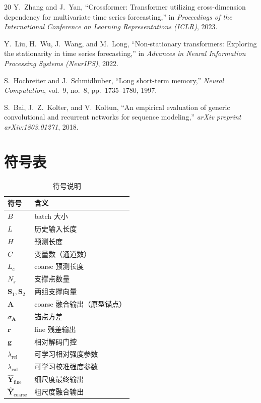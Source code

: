 \documentclass[journal]{IEEEtran}
\begin{document}
\begin{thebibliography}{20}
Y.~Zhang and J.~Yan, ``Crossformer: Transformer utilizing cross-dimension dependency for multivariate time series forecasting,'' in \emph{Proceedings of the International Conference on Learning Representations (ICLR)}, 2023.

Y.~Liu, H.~Wu, J.~Wang, and M.~Long, ``Non-stationary transformers: Exploring the stationarity in time series forecasting,'' in \emph{Advances in Neural Information Processing Systems (NeurIPS)}, 2022.

S.~Hochreiter and J.~Schmidhuber, ``Long short-term memory,'' \emph{Neural Computation}, vol.~9, no.~8, pp.~1735--1780, 1997.

S.~Bai, J.~Z.~Kolter, and V.~Koltun, ``An empirical evaluation of generic convolutional and recurrent networks for sequence modeling,'' \emph{arXiv preprint arXiv:1803.01271}, 2018.

\end{thebibliography}

\appendices

\section{符号表}
\label{app:symbols}

\begin{table}[h]
  \centering
  \caption{符号说明}
  \label{tab:symbols}
  \begin{tabular}{ll}
    \toprule
    符号 & 含义 \\
    \midrule
    $B$ & batch 大小 \\
    $L$ & 历史输入长度 \\
    $H$ & 预测长度 \\
    $C$ & 变量数（通道数） \\
    $L_c$ & coarse 预测长度 \\
    $N_s$ & 支撑点数量 \\
    $\mathbf{S}_1, \mathbf{S}_2$ & 两组支撑向量 \\
    $\mathbf{A}$ & coarse 融合输出（原型锚点） \\
    $\sigma_{\mathbf{A}}$ & 锚点方差 \\
    $\mathbf{r}$ & fine 残差输出 \\
    $\mathbf{g}$ & 相对解码门控 \\
    $\lambda_{\mathrm{rel}}$ & 可学习相对强度参数 \\
    $\lambda_{\mathrm{cal}}$ & 可学习校准强度参数 \\
    $\hat{\mathbf{Y}}_{\mathrm{fine}}$ & 细尺度最终输出 \\
    $\hat{\mathbf{Y}}_{\mathrm{coarse}}$ & 粗尺度融合输出 \\
    \bottomrule
  \end{tabular}
\end{table}
\end{document}
